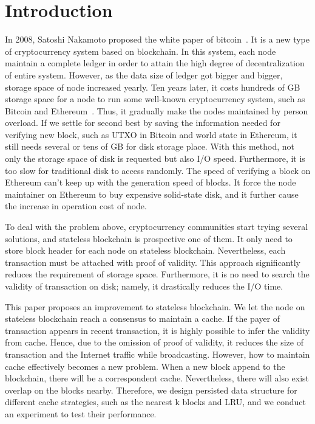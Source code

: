 \documentclass[conference]{IEEEtran}
\begin{document}
\section{Introduction}
In 2008, Satoshi Nakamoto proposed the white paper
of bitcoin~\cite{b3}. It is a new type of cryptocurrency
system based on blockchain. In this system, each node
maintain a complete ledger in order to attain the
high degree of decentralization of entire system.
However, as the data size of ledger got bigger and bigger,
storage space of node increased yearly. Ten years later,
it costs hundreds of GB storage space for a node to run
some well-known cryptocurrency system, such as Bitcoin and
Ethereum~\cite{b4}. Thus, it gradually make the nodes maintained
by person overload. If we settle for second best by saving the
information needed for verifying new block, such as UTXO in
Bitcoin and world state in Ethereum, it still needs
several or tens of GB for disk storage place. With
this method, not only the storage space of disk is
requested but also  I/O speed. Furthermore, it is
too slow for traditional disk to access randomly.
The speed of verifying a block on Ethereum can't keep
up with the generation speed of blocks. It force the node
maintainer on Ethereum to buy expensive solid-state disk,
and it further cause the increase in operation cost of node.

To deal with the problem above, cryptocurrency communities
start trying several solutions, and stateless blockchain
is prospective one of them. It only need to store
block header for each node on stateless blockchain.
Nevertheless, each transaction must be attached with
proof of validity. This approach significantly reduces
the requirement of storage space. Furthermore, it is
no need to search the validity of transaction on disk;
namely, it drastically reduces the I/O time.

This paper proposes an improvement to stateless blockchain.
We let the node on stateless blockchain reach a consensus
to maintain a cache. If the payer of transaction appears
in recent transaction, it is highly possible to infer
the validity from cache. Hence, due to the omission of
proof of validity, it reduces the size of transaction and
the Internet traffic while broadcasting. However, how
to maintain cache effectively becomes a new problem.
When a new block append to the blockchain, there will be
a correspondent cache. Nevertheless, there will
also exist overlap on the blocks nearby.
Therefore, we design persisted data structure
for different cache strategies, such as the
nearest k blocks and LRU, and we conduct an
experiment to test their performance.
\end{document}
